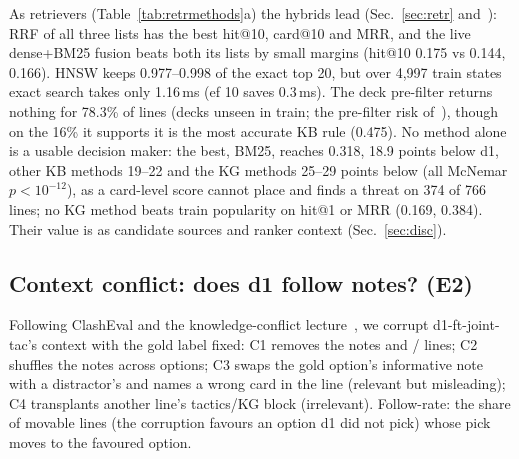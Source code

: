 
As retrievers (Table~\ref{tab:retrmethods}a) the hybrids lead (\cf Sec.~\ref{sec:retr} and~\cite{cap6938L08,cap6938L09,cap6938L10}): RRF of all three lists has the best hit@10, card@10 and MRR, and the live dense+BM25 fusion beats both its lists by small margins (hit@10 0.175 vs 0.144, 0.166). HNSW keeps 0.977--0.998 of the exact top 20, but over 4,997 train states exact search takes only 1.16\,ms (ef 10 saves 0.3\,ms). The deck pre-filter returns nothing for 78.3\% of lines (decks unseen in train; the pre-filter risk of~\cite{cap6938L09}), though on the 16\% it supports it is the most accurate KB rule (0.475). %
No method alone is a usable decision maker: the best, BM25, reaches 0.318, 18.9 points below d1, other KB methods 19--22 and the KG methods 25--29 points below (all McNemar $p<10^{-12}$), as a card-level score cannot place and finds a threat on 374 of 766 lines; no KG method beats train popularity on hit@1 or MRR (0.169, 0.384). Their value is as candidate sources and ranker context (Sec.~\ref{sec:disc}). %

\subsection{Context conflict: does d1 follow notes? (E2)}
\label{sec:conflict}

Following ClashEval and the knowledge-conflict lecture~\cite{wu2024clasheval,xie2024chameleon,lim2026l17}, we corrupt d1-ft-joint-tac's context with the gold label fixed: C1 removes the notes and / lines; C2 shuffles the notes across options; C3 swaps the gold option's informative note with a distractor's and names a wrong card in the  line (relevant but misleading); C4 transplants another line's tactics/KG block (irrelevant). Follow-rate: the share of movable lines (the corruption favours an option d1 did not pick) whose pick moves to the favoured option.

